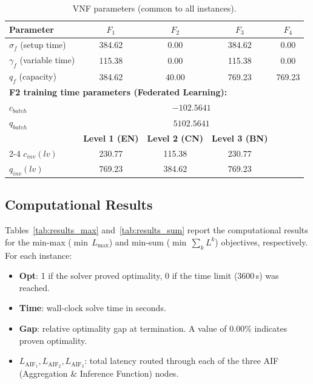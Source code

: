 \documentclass{article}
\begin{document}
\begin{table}[h!]
\centering
\small
\caption{VNF parameters (common to all instances).}
\label{tab:params}
\begin{tabular}{@{}l c c c c@{}}
\toprule
\textbf{Parameter} & $F_1$ & $F_2$ & $F_3$ & $F_4$ \\
\midrule
$\sigma_f$ (setup time)         & 384.62 & 0.00   & 384.62 & 0.00 \\
$\gamma_f$ (variable time)      & 115.38 & 0.00   & 115.38 & 0.00 \\
$q_f$ (capacity)                & 384.62 & 40.00  & 769.23 & 769.23 \\
\midrule
\multicolumn{5}{l}{\textbf{F2 training time parameters (Federated Learning):}} \\
\midrule
$c_{batch}$    & \multicolumn{4}{c}{$-102.5641$} \\
$q_{batch}$    & \multicolumn{4}{c}{$5102.5641$} \\
\midrule
 & \textbf{Level 1 (EN)} & \textbf{Level 2 (CN)} & \textbf{Level 3 (BN)} & \\
\cmidrule(lr){2-4}
$c_{inv}(lv)$  & 230.77 & 115.38 & 230.77 & \\
$q_{inv}(lv)$  & 769.23 & 384.62 & 769.23 & \\
\bottomrule
\end{tabular}
\end{table}

\newpage
\subsection*{Computational Results}

Tables~\ref{tab:results_max} and~\ref{tab:results_sum} report the computational results for the min-max ($\min\, L_{\max}$) and min-sum ($\min\, \sum_k L^k$) objectives, respectively. For each instance:
\begin{itemize}
    \item \textbf{Opt}: 1 if the solver proved optimality, 0 if the time limit (3600\,s) was reached.
    \item \textbf{Time}: wall-clock solve time in seconds.
    \item \textbf{Gap}: relative optimality gap at termination. A value of 0.00\% indicates proven optimality.
    \item $L_{\text{AIF}_1}, L_{\text{AIF}_2}, L_{\text{AIF}_3}$: total latency routed through each of the three AIF (Aggregation \& Inference Function) nodes.
\end{itemize}
\end{document}
